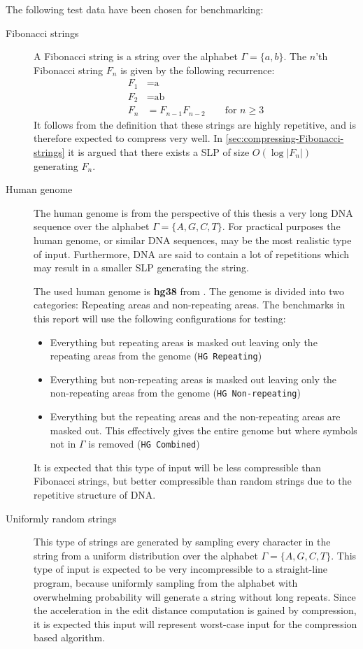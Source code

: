\documentclass[twoside,11pt,openright]{report}
\begin{document}
The following test data have been chosen for benchmarking:
\begin{description}
  \item[Fibonacci strings] A Fibonacci string is a string over the alphabet $\Gamma = \{a,b\}$. The $n$'th Fibonacci string $F_n$ is given by the following recurrence:
    \begin{align*}
      F_1 &= \text{a} \\
      F_2 &= \text{ab} \\
      F_{n} &= F_{n - 1} F_{n - 2} \quad\quad \text{for } n \geq 3
    \end{align*}
    It follows from the definition that these strings are highly repetitive, and is therefore expected to compress very well. In \cref{sec:compressing-Fibonacci-strings} it is argued that there exists a SLP of size $O(\log{|F_n|})$ generating $F_n$.
  \item[Human genome] The human genome is from the perspective of this thesis a very long DNA sequence over the alphabet $\Gamma = \{A,G,C,T\}$. For practical purposes the human genome, or similar DNA sequences, may be the most realistic type of input. Furthermore, DNA are said to contain a lot of repetitions which may result in a smaller SLP generating the string.

   The used human genome is \textbf{hg38} from \cite{HumanGenome}. The genome is divided into two categories: Repeating areas and non-repeating areas. The benchmarks in this report will use the following configurations for testing:
  \begin{itemize}
    \item Everything but repeating areas is masked out leaving only the repeating areas from the genome (\texttt{HG Repeating})
    \item Everything but non-repeating areas is masked out leaving only the non-repeating areas from the genome (\texttt{HG Non-repeating})
    \item Everything but the repeating areas and the non-repeating areas are masked out. This effectively gives the entire genome but where symbols not in $\Gamma$ is removed (\texttt{HG Combined})
  \end{itemize}
  It is expected that this type of input will be less compressible than Fibonacci strings, but better compressible than random strings due to the repetitive structure of DNA.

  \item[Uniformly random strings] This type of strings are generated by sampling every character in the string from a uniform distribution over the alphabet $\Gamma = \{A,G,C,T\}$. This type of input is expected to be very incompressible to a straight-line program, because uniformly sampling from the alphabet with overwhelming probability will generate a string without long repeats. Since the acceleration in the edit distance computation is gained by compression, it is expected this input will represent worst-case input for the compression based algorithm.
\end{description}
\end{document}

